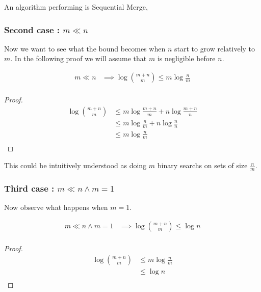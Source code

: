 An algorithm performing  is Sequential Merge, 


\subsubsection{Second case\texorpdfstring{ : $m \ll n$}{}}


Now we want to see what the bound becomes when $n$ start to grow relatively to $m$. In the following proof we will assume that $m$ is negligible before $n$.


\begin{lemma}
\begin{align*}
m \ll n &\implies \log\binom{m+n}{m} \leq m \log\frac{n}{m}\\
\end{align*}
\end{lemma}

\begin{proof}
\begin{align*}
\log\binom{m+n}{m} &\leq m \log\frac{m+n}{m} + n \log\frac{m+n}{n}\\
&\leq m \log\frac{n}{m} + n \log\frac{n}{n}\\
&\leq m \log\frac{n}{m}\\
\end{align*}
\end{proof}


This could be intuitively understood as doing $m$ binary searchs on sets of size $\frac{n}{m}$.



\subsubsection{Third case\texorpdfstring{ : $m \ll n \land m = 1$}{}}

Now observe what happens when $m = 1$.

\begin{lemma}
\begin{align*}
m \ll n \land m = 1 &\implies \log\binom{m+n}{m} \leq \log n\\
\end{align*}
\end{lemma}

\begin{proof}
\begin{align*}
\log\binom{m+n}{m} &\leq m \log\frac{n}{m}\\
&\leq \log n\\
\end{align*}
\end{proof}

